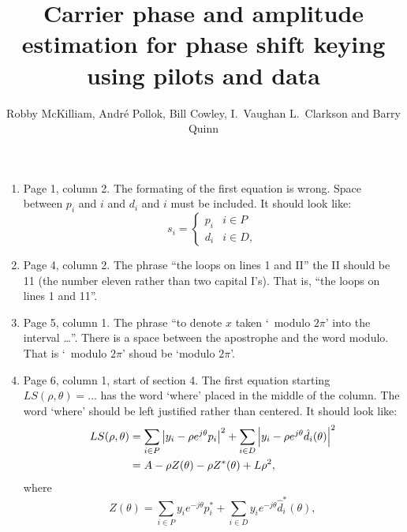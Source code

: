 \documentclass[a4paper,10pt]{article}
\title{Carrier phase and amplitude estimation for phase shift keying using pilots and data}
\author{Robby McKilliam, Andr\'{e} Pollok, Bill Cowley, I.\ Vaughan L.\ Clarkson and Barry Quinn  
}
\begin{document}

\begin{enumerate}
\item Page 1, column 2.  The formating of the first equation is wrong.  Space between $p_i$ and $i$ and $d_i$ and $i$ must be included.  It should look like:
\[
s_i = \begin{cases}
p_i & i \in P \\
d_i & i \in D,
\end{cases}
\]


\item Page 4, column 2.  The phrase ``the loops on lines 1 and II'' the II should be 11 (the number eleven rather than two capital I's).  That is, ``the loops on lines 1 and 11''.

\item Page 5, column 1.  The phrase ``to denote $x$ taken `~modulo $2\pi$' into the interval \dots''.  There is a space between the apostrophe and the word modulo.  That is `~modulo $2\pi$' shoud be `modulo $2\pi$'. 

\item Page 6, column 1, start of section 4.  The first equation starting $LS(\rho, \theta) = \dots$ has the word `where' placed in the middle of the column.  The word `where' should be left justified rather than centered.  It should look like:
 \begin{align*}
LS(\rho, \theta) &=\sum_{i \in P} {\left\vert  y_i - \rho e^{j\theta} p_i  \right\vert}^2 + \sum_{i \in D} {\left\vert  y_i - \rho e^{j\theta} \hat{d_i}(\theta)  \right\vert}^2 \\
&= A - \rho Z(\theta) - \rho Z^*(\theta) + L \rho^2,
\end{align*}
where
\[
Z(\theta)  = \sum_{i \in P} y_i e^{-j\theta} p_i^* + \sum_{i \in D} y_i e^{-j\theta} \hat{d}_i^*(\theta),
\]


\end{enumerate}
\end{document}
